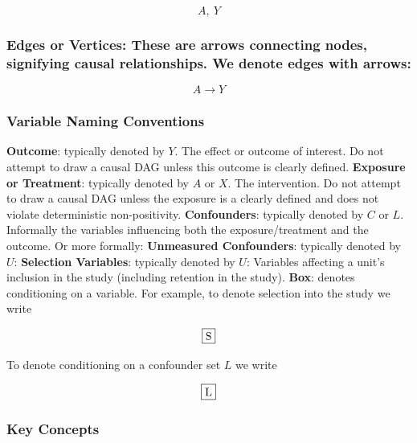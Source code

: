 \documentclass[
  singlecolumn]{report}
\begin{document}
\[
A, ~ Y
\]

\hypertarget{edges-or-vertices-these-are-arrows-connecting-nodes-signifying-causal-relationships.-we-denote-edges-with-arrows}{%
\subsubsection{\texorpdfstring{\textbf{Edges or Vertices:} These are
arrows connecting nodes, signifying causal relationships. We denote
edges with
arrows:}{Edges or Vertices: These are arrows connecting nodes, signifying causal relationships. We denote edges with arrows:}}\label{edges-or-vertices-these-are-arrows-connecting-nodes-signifying-causal-relationships.-we-denote-edges-with-arrows}}

\[
   A \to Y
\]

\hypertarget{variable-naming-conventions}{%
\subsubsection{\texorpdfstring{\textbf{Variable Naming
Conventions}}{Variable Naming Conventions}}\label{variable-naming-conventions}}

\textbf{Outcome}: typically denoted by \(Y\). The effect or outcome of
interest. Do not attempt to draw a causal DAG unless this outcome is
clearly defined. \textbf{Exposure or Treatment}: typically denoted by
\(A\) or \(X\). The intervention. Do not attempt to draw a causal DAG
unless the exposure is a clearly defined and does not violate
deterministic non-positivity. \textbf{Confounders}: typically denoted by
\(C\) or \(L\). Informally the variables influencing both the
exposure/treatment and the outcome. Or more formally: \textbf{Unmeasured
Confounders}: typically denoted by \(U\): \textbf{Selection Variables}:
typically denoted by \(U\): Variables affecting a unit's inclusion in
the study (including retention in the study). \textbf{Box}: denotes
conditioning on a variable. For example, to denote selection into the
study we write

\[\framebox{S}\]

To denote conditioning on a confounder set \(L\) we write

\[\framebox{L}\]

\hypertarget{key-concepts}{%
\subsubsection{\texorpdfstring{\textbf{Key
Concepts}}{Key Concepts}}\label{key-concepts}}
\end{document}
